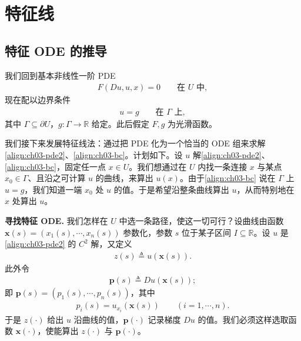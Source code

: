 \documentclass[../../main.tex]{subfiles}
\begin{document}
\section{特征线}\label{section:ch03-characteristics}

\subsection{特征 ODE 的推导}\label{subsection:ch03-char-derive}

我们回到基本非线性一阶 PDE
\begin{align}\label{align:ch03-pde2}
F(Du,u,x)=0 \qquad \text{在 }U\text{ 中},
\end{align}
现在配以边界条件
\begin{align}\label{align:ch03-bc}
u=g \qquad \text{在 }\Gamma\text{ 上},
\end{align}
其中 $\Gamma\subseteq\partial U$，$g:\Gamma\to\mathbb{R}$ 给定。此后假定 $F,g$ 为光滑函数。

我们接下来发展特征线法：通过把 PDE 化为一个恰当的 ODE 组来求解\eqref{align:ch03-pde2}、\eqref{align:ch03-bc}。计划如下。设 $u$ 解\eqref{align:ch03-pde2}、\eqref{align:ch03-bc}，固定任一点 $x\in U$。我们想通过在 $U$ 内找一条连接 $x$ 与某点 $x_0\in\Gamma$、且沿之可计算 $u$ 的曲线，来算出 $u(x)$。由于\eqref{align:ch03-bc} 说在 $\Gamma$ 上 $u=g$，我们知道一端 $x_0$ 处 $u$ 的值。于是希望沿整条曲线算出 $u$，从而特别地在 $x$ 处算出 $u$。

\textbf{寻找特征 ODE.} 我们怎样在 $U$ 中选一条路径，使这一切可行？设曲线由函数 $\mathbf{x}(s)=(x_1(s),\cdots,x_n(s))$ 参数化，参数 $s$ 位于某子区间 $I\subseteq\mathbb{R}$。设 $u$ 是\eqref{align:ch03-pde2} 的 $C^2$ 解，又定义
\begin{align}\label{align:ch05-Riesz}
z(s)\triangleq u(\mathbf{x}(s)).
\end{align}
此外令
\begin{align}\label{align:ch03-p}
\mathbf{p}(s)\triangleq Du(\mathbf{x}(s));
\end{align}
即 $\mathbf{p}(s)=(p_1(s),\cdots,p_n(s))$，其中
\begin{align}\label{align:ch03-pi}
p_i(s)=u_{x_i}(\mathbf{x}(s)) \qquad (i=1,\cdots,n).
\end{align}
于是 $z(\cdot)$ 给出 $u$ 沿曲线的值，$\mathbf{p}(\cdot)$ 记录梯度 $Du$ 的值。我们必须这样选取函数 $\mathbf{x}(\cdot)$，使能算出 $z(\cdot)$ 与 $\mathbf{p}(\cdot)$。
\end{document}
